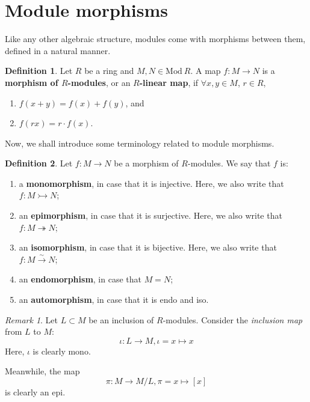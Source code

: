 \documentclass[12pt, a4paper, titlepage]{report}
\theoremstyle{plain} %
\theoremstyle{definition}
\newtheorem{defn}{Definition}[section]
\theoremstyle{remark}
\newtheorem*{rem}{Remark}
\begin{document}
\section{Module morphisms}

Like any other algebraic structure, modules come with morphisms between them, defined in a natural manner.

\begin{defn}
  Let $R$ be a ring and $M, N \in \mathrm{Mod} \ R$. A map $f : M \rightarrow N$ is a \textbf{morphism of $R$-modules},
  or an \textbf{$R$-linear map}, if $\forall x, y \in M$, $r \in R$,

  \begin{enumerate}
  \item $f(x + y) = f(x) + f(y)$, and
  \item $f(rx) = r \cdot f(x)$.
  \end{enumerate}
\end{defn}

Now, we shall introduce some terminology related to module morphisms.

\begin{defn}
  Let $f : M \rightarrow N$ be a morphism of $R$-modules. We say that $f$ is:
  \begin{enumerate}
  \item a \textbf{monomorphism}, in case that it is injective. Here,
    we also write that $f : M \rightarrowtail N$;
  \item an \textbf{epimorphism}, in case that it is surjective. Here,
    we also write that $f : M \twoheadrightarrow N$;
  \item an \textbf{isomorphism}, in case that it is bijective. Here,
    we also write that $f : M \xrightarrow{\sim} N$;
  \item an \textbf{endomorphism}, in case that $M = N$;
  \item an \textbf{automorphism}, in case that it is endo and iso.
  \end{enumerate}
\end{defn}

\begin{rem}
  Let $L \subset M$ be an inclusion of $R$-modules. Consider the \textit{inclusion map} from
  $L$ to $M$:
  \[
    \iota : L \rightarrow M, \iota = x \mapsto x
  \]
  Here, $\iota$ is clearly mono.

  Meanwhile, the map
  \[
    \pi : M \rightarrow M/L, \pi = x \mapsto [x]
  \]
  is clearly an epi.
\end{rem}
\end{document}

